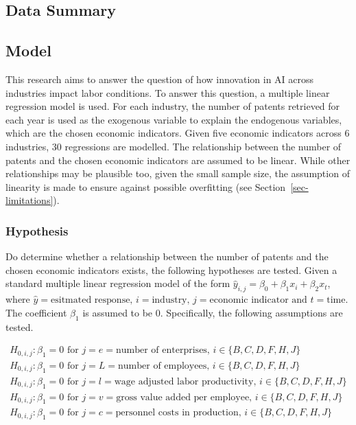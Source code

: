 \documentclass[
  11,
  a4paperpaper,
]{article}
\begin{document}
\subsection{Data Summary}\label{sec-data-summary}

\subsection{Model}\label{sec-model}

This research aims to answer the question of how innovation in AI across
industries impact labor conditions. To answer this question, a multiple
linear regression model is used. For each industry, the number of
patents retrieved for each year is used as the exogenous variable to
explain the endogenous variables, which are the chosen economic
indicators. Given five economic indicators across 6 industries, 30
regressions are modelled. The relationship between the number of patents
and the chosen economic indicators are assumed to be linear. While other
relationships may be plausible too, given the small sample size, the
assumption of linearity is made to ensure against possible overfitting
(see Section~\ref{sec-limitations}).

\subsubsection{Hypothesis}\label{sec-hypothesis}

Do determine whether a relationship between the number of patents and
the chosen economic indicators exists, the following hypotheses are
tested. Given a standard multiple linear regression model of the form
\(\hat{y}_{i,j} = \beta_0 + \beta_1x_i + \beta_2x_t\), where
\(\hat{y}=\text{esitmated response, }i=\text{industry, }j=\text{economic indicator }\text{and }t=\text{time}\).
The coefficient \(\beta_1\) is assumed to be \(0\). Specifically, the
following assumptions are tested.

\begin{align}
H_{0, i, j}: \beta_1 = 0\text{ for }j=e=\text{number of enterprises, } i\in\{B, C, D, F, H, J\} \\
H_{0, i, j}: \beta_1 = 0\text{ for }j=L=\text{number of employees, } i\in\{B, C, D, F, H, J\}\\
H_{0, i, j}: \beta_1 = 0\text{ for }j=l=\text{wage adjusted labor productivity, } i\in\{B, C, D, F, H, J\}\\
H_{0, i, j}: \beta_1 = 0\text{ for }j=v=\text{gross value added per employee, } i\in\{B, C, D, F, H, J\}\\
H_{0, i, j}: \beta_1 = 0\text{ for }j=c=\text{personnel costs in production, } i\in\{B, C, D, F, H, J\}
\end{align}
\end{document}
